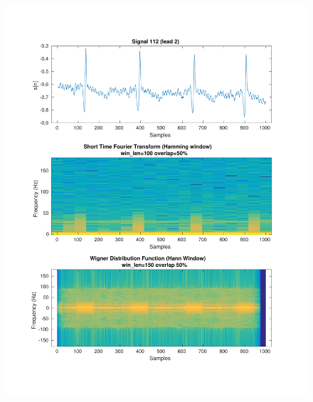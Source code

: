 \documentclass[11pt,a4paper]{article}
\begin{document}
\begin{figure}[H]
\centering
\begin{minipage}{0.48\textwidth}
	\centering
	\includegraphics[width=\textwidth]{fig/112l2_stft_wdf.pdf}
	

\end{minipage}
\end{figure}
\end{document}

